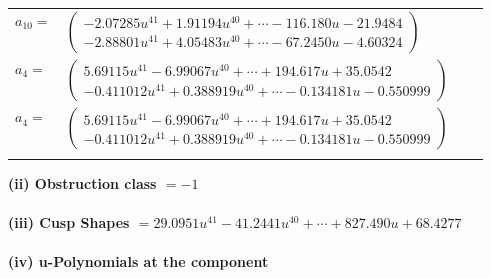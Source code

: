\documentclass[1p]{elsarticle_modified}
\theoremstyle{definition}
\begin{document}
\begin{tabular}{m{7pt} m{180pt} m{7pt} m{180pt} }
\flushright $a_{10}=$&$\begin{pmatrix}-2.07285 u^{41}+1.91194 u^{40}+\cdots-116.180 u-21.9484\\-2.88801 u^{41}+4.05483 u^{40}+\cdots-67.2450 u-4.60324\end{pmatrix}$ \\
\flushright $a_{4}=$&$\begin{pmatrix}5.69115 u^{41}-6.99067 u^{40}+\cdots+194.617 u+35.0542\\-0.411012 u^{41}+0.388919 u^{40}+\cdots-0.134181 u-0.550999\end{pmatrix}$\\ \flushright $a_{4}=$&$\begin{pmatrix}5.69115 u^{41}-6.99067 u^{40}+\cdots+194.617 u+35.0542\\-0.411012 u^{41}+0.388919 u^{40}+\cdots-0.134181 u-0.550999\end{pmatrix}$\\&\end{tabular}
\flushleft \textbf{(ii) Obstruction class $= -1$}\\~\\
\flushleft \textbf{(iii) Cusp Shapes $= 29.0951 u^{41}-41.2441 u^{40}+\cdots+827.490 u+68.4277$}\\~\\
\newpage\renewcommand{\arraystretch}{1}
\flushleft \textbf{(iv) u-Polynomials at the component}\newline \\
\end{document}
